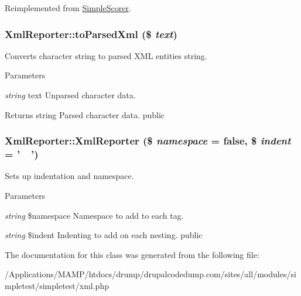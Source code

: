 Reimplemented from \hyperlink{class_simple_scorer_aa82186cb9bf706d675336aefd6ba355f}{SimpleScorer}.\hypertarget{class_xml_reporter_a5fda8560592459439b2f12436be5f352}{
\subsubsection[{toParsedXml}]{\setlength{\rightskip}{0pt plus 5cm}XmlReporter::toParsedXml (\$ {\em text})}}
\label{class_xml_reporter_a5fda8560592459439b2f12436be5f352}
Converts character string to parsed XML entities string. 
\begin{DoxyParams}{Parameters}
\item[{\em string}]text Unparsed character data. \end{DoxyParams}
\begin{DoxyReturn}{Returns}
string Parsed character data.  public 
\end{DoxyReturn}
\hypertarget{class_xml_reporter_a3d2fe0351607e3552290a523825f2c71}{
\subsubsection[{XmlReporter}]{\setlength{\rightskip}{0pt plus 5cm}XmlReporter::XmlReporter (\$ {\em namespace} = {\ttfamily false}, \/  \$ {\em indent} = {\ttfamily '~~'})}}
\label{class_xml_reporter_a3d2fe0351607e3552290a523825f2c71}
Sets up indentation and namespace. 
\begin{DoxyParams}{Parameters}
\item[{\em string}]\$namespace Namespace to add to each tag. \item[{\em string}]\$indent Indenting to add on each nesting.  public \end{DoxyParams}


The documentation for this class was generated from the following file:\begin{DoxyCompactItemize}
\item 
/Applications/MAMP/htdocs/drump/drupalcodedump.com/sites/all/modules/simpletest/simpletest/xml.php\end{DoxyCompactItemize}
